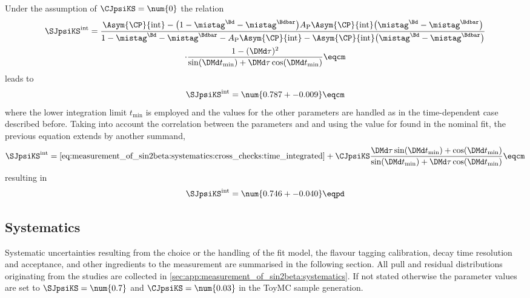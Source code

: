 %
Under the \SM assumption of $\CJpsiKS = \num{0}$ the relation
%
\begin{multline}\label{eq:measurement_of_sin2beta:systematics:cross_checks:time_integrated}
  \SJpsiKS^{\text{int}} = 
  \frac{ \Asym{\CP}{\text{int}} - \bigl( 1 - \mistag^{\Bd} - \mistag^{\Bdbar}\bigr) A_{\text{P}} \Asym{\CP}{\text{int}} \bigl( \mistag^{\Bd} - \mistag^{\Bdbar} \bigr)}
    {1 - \mistag^{\Bd} - \mistag^{\Bdbar} - A_{\text{P}} \Asym{\CP}{\text{int}} - \Asym{\CP}{\text{int}} \bigl( \mistag^{\Bd} - \mistag^{\Bdbar} \bigr) } \\
  \cdot\frac{1 - (\DMd \tau)^2}{ \sin (\DMd t_{\text{min}}) + \DMd \tau \cos (\DMd t_{\text{min}})} \eqcm
\end{multline}
%
leads to 
%
\begin{equation*}
  \SJpsiKS^{\text{int}} = \num{0.787 +- 0.009} \eqcm
\end{equation*}
%
where the lower integration limit $t_{\text{min}}$ is employed and the values
for the other parameters are handled as in the time-dependent case described
before. Taking into account the correlation between the \CP parameters \SJpsiKS
and \CJpsiKS and using the value for \CJpsiKS found in the nominal fit, the
previous equation extends by another summand,
%
\begin{equation}
  \SJpsiKS^{\text{int}} = \text{\cref{eq:measurement_of_sin2beta:systematics:cross_checks:time_integrated}} 
  + \CJpsiKS \frac{\DMd \tau \sin (\DMd t_{\text{min}}) + \cos (\DMd t_{\text{min}})}{\sin (\DMd t_{\text{min}}) + \DMd \tau \cos (\DMd t_{\text{min}})} \eqcm
\end{equation}
%
resulting in
%
\begin{equation*}
  \SJpsiKS^{\text{int}} = \num{0.746 +- 0.040} \eqpd
\end{equation*}
%

\subsection{Systematics}
\label{sec:measurement_of_sin2beta:systematics:systematics}

Systematic uncertainties resulting from the choice or the handling of the fit
model, the flavour tagging calibration, decay time resolution and acceptance,
and other ingredients to the measurement are summarised in the following
section. All pull and residual distributions originating from the studies are
collected in \cref{sec:app:measurement_of_sin2beta:systematics}. If not stated
otherwise the \CP parameter values are set to $\SJpsiKS = \num{0.7}$ and
$\CJpsiKS = \num{0.03}$ in the \acf{ToyMC} sample generation.

